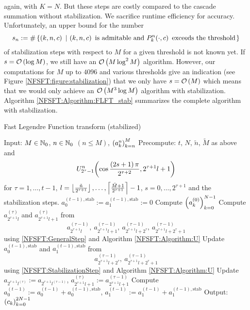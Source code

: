 again, with $K = N$. But these steps are costly compared to the cascade summation without stabilization. We sacrifice runtime efficiency 
for accuracy. Unfortunately, an upper bound for the number 
\[
  s_{n} := \#\left\{\left(k,n,c\right)\ \left|\ \left(k,n,c\right) \text{ is admitable and } P_{k}^n{\hspace{-0.4ex}}\left(\cdot,c\right) \text{ exceeds the threshold}\right.\right\rbrace
\] 
of stabilization steps with respect to $M$ for a given threshold is not known yet. If $s = \mathcal{O}\left(\log M\right)$, 
we still have an $\mathcal{O}\left(M \log^2 M\right)$ algorithm. However, our computations for $M$ up to $4096$ and various 
thresholds give an indication (see Figure \ref{NFSFT:figure:stabilization}) 
that we only have $s = \mathcal{O}\left(M\right)$ which means that we would only achieve an $\mathcal{O}\left(M^3 \log M\right)$ algorithm with stabilization. 
Algorithm \ref{NFSFT:Algorithm:FLFT_stab} summarizes the complete algorithm with stabilization.
\begin{algorithm}[htb]
  \caption{Fast Legendre Function transform (stabilized)}
  \label{NFSFT:Algorithm:FLFT_stab}    
  \begin{algorithmic}
    \STATE Input:  $M \in \mathbb{N}_{0}$, $n \in \mathbb{N}_{0}$ $(n \le M)$, $\left(a_k^n\right)_{k=n}^{M}$
    \STATE Precompute: $t$, $N$, $\tilde{n}$, $\tilde{M}$ as above and \[U_{2^{\tau}-1}^{n}{\hspace{-0.4ex}}\left(\cos \frac{\left(2s+1\right)\pi}{2^{\tau+2}}, 2^{\tau+1}l+1\right)\] 
    \STATE {} for $\tau = 1,\ldots,t-1$, $l = \left\lfloor\frac{\tilde{n}}{2^{\tau+1}}\right\rfloor,\ldots,\left\lceil\frac{\tilde{M}+1}{2^{\tau+1}}\right\rceil-1$, 
    \STATE {} $s = 0,\ldots,2^{\tau+1}$ and the stabilization steps.
    \STATE $a_{0}^{(t-1),\text{stab}} := a_{1}^{(t-1),\text{stab}} := 0$
    \STATE Compute $\left(a_{k}^{(0)}\right)_{k=0}^{N-1}$ 
          \STATE Compute $a_{2^{\tau+1}l}^{(\tau)}$ and $a_{2^{\tau+1}l+1}^{(\tau)}$ from \[a_{2^{\tau+1}l}^{(\tau-1)},\  
            a_{2^{\tau+1}l+1}^{(\tau-1)},\ a_{2^{\tau+1}l+2^{\tau}}^{(\tau-1)},\ a_{2^{\tau+1}l+2^{\tau}+1}^{(\tau-1)}\] using 
            \eqref{NFSFT:GeneralStep} and Algorithm \ref{NFSFT:Algorithm:U}
        \ELSE
          \STATE Update $a_{0}^{(t-1),\text{stab}}$ and $a_{1}^{(t-1),\text{stab}}$ from
            \[ 
              a_{2^{\tau+1}l+2^{\tau}}^{(\tau-1)},\ a_{2^{\tau+1}l+2^{\tau}+1}^{(\tau-1)}
            \] 
            using \eqref{NFSFT:StabilizationStep} and Algorithm \ref{NFSFT:Algorithm:U}
          \STATE Update $a_{2^{\tau+1}l^{(\tau)}} := a_{2^{\tau+1}l^{(\tau-1)}}$, $a_{2^{\tau+1}l+1}^{(\tau)} := a_{2^{\tau+1}l+1}^{(\tau-1)}$
        \ENDIF
      \ENDFOR
    \ENDFOR
    \STATE Compute $a_{0}^{(t-1)} := a_{0}^{(t-1)} + a_{0}^{(t-1),\text{stab}}$, $a_{1}^{(t-1)} := a_{1}^{(t-1)} + a_{1}^{(t-1),\text{stab}}$
    \STATE Output: $\left(c_{k}\right)_{k=0}^{2N-1}$
\end{algorithmic}
\end{algorithm}

